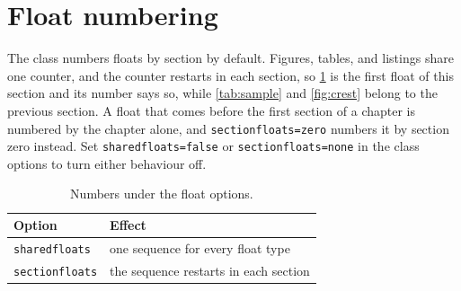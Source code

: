 \section{Float numbering}
The class numbers floats by section by default. Figures, tables, and listings share one counter, and the counter restarts in each section, so \cref{tab:numbering} is the first float of this section and its number says so, while \cref{tab:sample} and \cref{fig:crest} belong to the previous section. A float that comes before the first section of a chapter is numbered by the chapter alone, and \texttt{sectionfloats=zero} numbers it by section zero instead. Set \texttt{sharedfloats=false} or \texttt{sectionfloats=none} in the class options to turn either behaviour off.

\begin{table}[htbp]
  \centering
  \caption{Numbers under the float options.}
  \label{tab:numbering}
  \begin{tabular}{ll}
    \hline
    Option & Effect \\
    \hline
    \texttt{sharedfloats} & one sequence for every float type \\
    \texttt{sectionfloats} & the sequence restarts in each section \\
    \hline
  \end{tabular}
\end{table}
